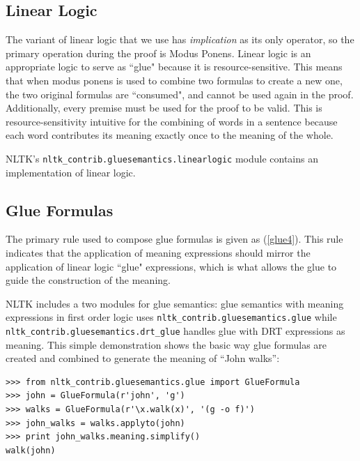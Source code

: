\documentclass[11pt]{article}
\newcommand{\dhgcode}[1]{{\tt #1}}
\begin{document}
\subsection{Linear Logic}
The variant of linear logic that we use has \emph{implication} as its only operator, so the primary operation during the proof is Modus Ponens.  Linear logic is an appropriate logic to serve as ``glue" because it is resource-sensitive.  This means that when modus ponens is used to combine two formulas to create a new one, the two original formulas are ``consumed", and cannot be used again in the proof.  Additionally, every premise must be used for the proof to be valid.  This is resource-sensitivity intuitive for the combining of words in a sentence because each word contributes its meaning exactly once to the meaning of the whole.


NLTK's \dhgcode{nltk\_contrib.gluesemantics.linearlogic} module contains an implementation of linear logic.

\subsection{Glue Formulas}
The primary rule used to compose glue formulas is given as (\ref{glue4}).  This rule indicates that the application of meaning expressions should mirror the application of linear logic ``glue" expressions, which is what allows the glue to guide the construction of the meaning.


NLTK includes a two modules for glue semantics: glue semantics with meaning expressions in first order logic uses \dhgcode{nltk\_contrib.gluesemantics.glue} while \dhgcode{nltk\_contrib.gluesemantics.drt\_glue} handles glue with DRT expressions as meaning.  This simple demonstration shows the basic way glue formulas are created and combined to generate the meaning of ``John walks'':

\begin{verbatim}
>>> from nltk_contrib.gluesemantics.glue import GlueFormula
>>> john = GlueFormula(r'john', 'g')
>>> walks = GlueFormula(r'\x.walk(x)', '(g -o f)')
>>> john_walks = walks.applyto(john)
>>> print john_walks.meaning.simplify()
walk(john)
\end{verbatim}
\end{document}
